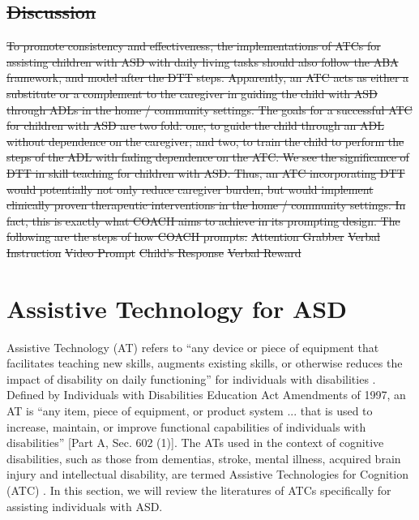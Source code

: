 \documentclass{ut-thesis}
\providecommand{\DIFdeltex}[1]{{\protect\color{red}\sout{#1}}}                      %
\providecommand{\DIFdelend}{} %
\providecommand{\DIFdel}[1]{\texorpdfstring{\DIFdeltex{#1}}{}} %
\begin{document}
\subsection{\DIFdel{Discussion}}
\addtocounter{subsection}{-1}%
\DIFdel{To promote consistency and effectiveness, the implementations of ATCs for assisting children with ASD with daily living tasks should also follow the ABA framework, and model after the DTT steps.  Apparently, an ATC acts as either a substitute or a complement to the caregiver in guiding the child with ASD through ADLs in the home / community settings.  The goals for a successful ATC for children with ASD are two fold: one, to guide the child through an ADL without dependence on the caregiver; and two, to train the child to perform the steps of the ADL with fading dependence on the ATC.  We see the significance of DTT in skill teaching for children with ASD.  Thus, an ATC incorporating DTT would potentially not only reduce caregiver burden, but would implement clinically proven therapeutic interventions in the home / community settings.  In fact, this is exactly what COACH aims to achieve in its prompting design.  The following are the steps of how COACH prompts:
}%
\DIFdel{Attention Grabber
	}%
\DIFdel{Verbal Instruction
	}%
\DIFdel{Video Prompt
	}%
\DIFdel{Child's Response
	}%
\DIFdel{Verbal Reward
}%

\DIFdelend \section{Assistive Technology for ASD}
Assistive Technology (AT) refers to ``any device or piece of equipment that facilitates teaching new skills, augments existing skills, or otherwise reduces the impact of disability on daily functioning'' for individuals with disabilities \cite{lang2014assistive}.  Defined by Individuals with Disabilities Education Act Amendments of 1997, an AT is ``any item, piece of equipment, or product system ... that is used to increase, maintain, or improve functional capabilities of individuals with disabilities'' [Part A, Sec. 602 (1)].  The ATs used in the context of cognitive disabilities, such as those from dementias, stroke, mental illness, acquired brain injury and intellectual disability, are termed Assistive Technologies for Cognition (ATC) \cite{frank2004assistive}.  In this section, we will review the literatures of ATCs specifically for assisting individuals with ASD.
\end{document}
